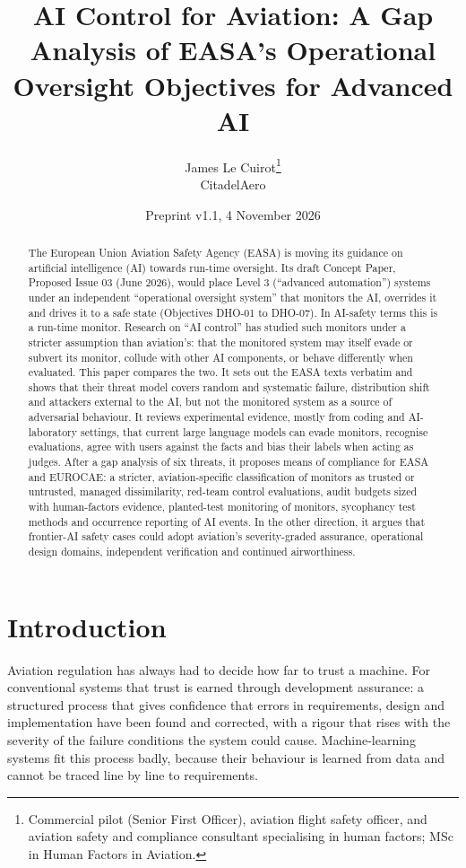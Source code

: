 \documentclass[11pt]{article}
\title{AI Control for Aviation: A Gap Analysis of EASA's Operational Oversight Objectives for Advanced AI}
\author{James Le Cuirot\thanks{Commercial pilot (Senior First Officer), aviation flight safety officer, and aviation safety and compliance consultant specialising in human factors; MSc in Human Factors in Aviation.}\\[2pt] \normalsize CitadelAero}
\date{Preprint v1.1, 4 November 2026}
\begin{document}
\maketitle

\begin{abstract}
The European Union Aviation Safety Agency (EASA) is moving its guidance on artificial intelligence (AI) towards run-time oversight. Its draft Concept Paper, Proposed Issue 03 (June 2026), would place Level 3 (``advanced automation'') systems under an independent ``operational oversight system'' that monitors the AI, overrides it and drives it to a safe state (Objectives DHO-01 to DHO-07). In AI-safety terms this is a run-time monitor. Research on ``AI control'' has studied such monitors under a stricter assumption than aviation's: that the monitored system may itself evade or subvert its monitor, collude with other AI components, or behave differently when evaluated. This paper compares the two. It sets out the EASA texts verbatim and shows that their threat model covers random and systematic failure, distribution shift and attackers external to the AI, but not the monitored system as a source of adversarial behaviour. It reviews experimental evidence, mostly from coding and AI-laboratory settings, that current large language models can evade monitors, recognise evaluations, agree with users against the facts and bias their labels when acting as judges. After a gap analysis of six threats, it proposes means of compliance for EASA and EUROCAE: a stricter, aviation-specific classification of monitors as trusted or untrusted, managed dissimilarity, red-team control evaluations, audit budgets sized with human-factors evidence, planted-test monitoring of monitors, sycophancy test methods and occurrence reporting of AI events. In the other direction, it argues that frontier-AI safety cases could adopt aviation's severity-graded assurance, operational design domains, independent verification and continued airworthiness.
\end{abstract}

\section{Introduction}\label{sec:intro}

Aviation regulation has always had to decide how far to trust a machine. For conventional systems that trust is earned through development assurance: a structured process that gives confidence that errors in requirements, design and implementation have been found and corrected, with a rigour that rises with the severity of the failure conditions the system could cause. Machine-learning systems fit this process badly, because their behaviour is learned from data and cannot be traced line by line to requirements.
\end{document}
